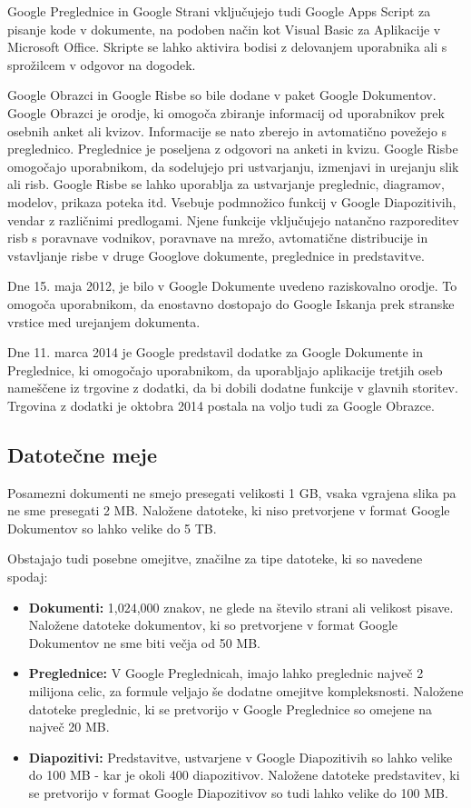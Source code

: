 \documentclass[a4paper, 12pt]{book}
\begin{document}
Google Preglednice in Google Strani vključujejo tudi Google Apps Script za pisanje kode v dokumente, na podoben način kot Visual Basic za Aplikacije v Microsoft Office. Skripte se lahko aktivira bodisi z delovanjem uporabnika ali s sprožilcem v odgovor na dogodek. \cite{68} \cite{69}

Google Obrazci in Google Risbe so bile dodane v paket Google Dokumentov. Google Obrazci je orodje, ki omogoča zbiranje informacij od uporabnikov prek osebnih anket ali kvizov. Informacije se nato zberejo in avtomatično povežejo s preglednico. Preglednice je poseljena z odgovori na anketi in kvizu. \cite{70} \cite{71}
Google Risbe omogočajo uporabnikom, da sodelujejo pri ustvarjanju, izmenjavi in urejanju slik ali risb. Google Risbe se lahko uporablja za ustvarjanje preglednic, diagramov, modelov, prikaza poteka itd. Vsebuje podmnožico funkcij v Google Diapozitivih, vendar z različnimi predlogami. Njene funkcije vključujejo natančno razporeditev risb s poravnave vodnikov, poravnave na mrežo, avtomatične distribucije in vstavljanje risbe v druge Googlove dokumente, preglednice in predstavitve. \cite{72} \cite{73}

Dne 15. maja 2012, je bilo v Google Dokumente uvedeno raziskovalno orodje. \cite{74} To omogoča uporabnikom, da enostavno dostopajo do Google Iskanja prek stranske vrstice med urejanjem dokumenta. \cite{75}

Dne 11. marca 2014 je Google predstavil dodatke za Google Dokumente in Preglednice, ki omogočajo uporabnikom, da uporabljajo aplikacije tretjih oseb nameščene iz trgovine z dodatki, da bi dobili dodatne funkcije v glavnih storitev. \cite{76} Trgovina z dodatki je oktobra 2014 postala na voljo tudi za Google Obrazce. \cite{77} 

\subsection{Datotečne meje}

Posamezni dokumenti ne smejo presegati velikosti 1 GB, vsaka vgrajena slika pa ne sme presegati 2 MB. \cite{78} Naložene datoteke, ki niso pretvorjene v format Google Dokumentov so lahko velike do 5 TB.\cite{78}

Obstajajo tudi posebne omejitve, značilne za tipe datoteke, ki so navedene spodaj: \cite{78}
\begin{itemize}
	\item \textbf{Dokumenti:}
	1,024,000 znakov, ne glede na število strani ali velikost pisave. Naložene datoteke dokumentov, ki so pretvorjene v format Google Dokumentov ne sme biti večja od 50 MB.
	\item \textbf{Preglednice:}
	V Google Preglednicah, imajo lahko preglednic največ 2 milijona celic, za formule veljajo še dodatne omejitve kompleksnosti. Naložene datoteke preglednic, ki se pretvorijo v Google Preglednice so omejene na največ 20 MB.
	\item \textbf{Diapozitivi:}
	Predstavitve, ustvarjene v Google Diapozitivih so lahko velike do 100 MB - kar je okoli 400 diapozitivov. Naložene datoteke predstavitev, ki se pretvorijo v format Google Diapozitivov so tudi lahko velike do 100 MB. 
\end{itemize}
\end{document}
